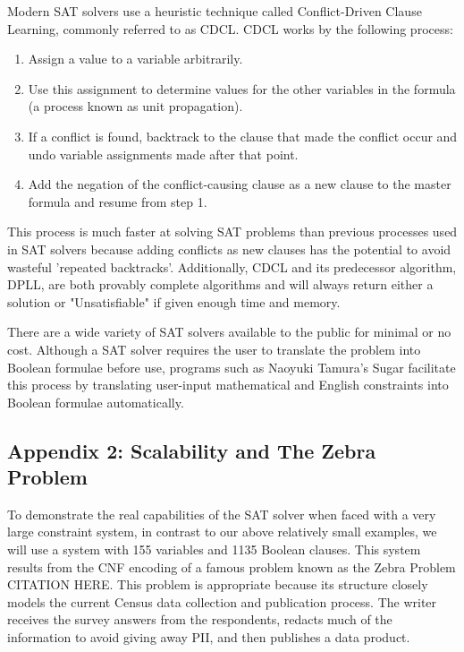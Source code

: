 \documentclass[jou,apacite]{apa6}
\begin{document}
Modern SAT solvers use a heuristic technique called Conflict-Driven Clause Learning, commonly referred to as CDCL. CDCL works by the following process:

\begin{enumerate}

\item Assign a value to a variable arbitrarily.
\item Use this assignment to determine values for the other variables in the formula (a process known as unit propagation).
\item If a conflict is found, backtrack to the clause that made the conflict occur and undo variable assignments made after that point.
\item Add the negation of the conflict-causing clause as a new clause to the master formula and resume from step 1.

\end{enumerate}

This process is much faster at solving SAT problems than previous processes used in SAT solvers because adding conflicts as new clauses has the potential to avoid wasteful 'repeated backtracks'. Additionally, CDCL and its predecessor algorithm, DPLL, are both provably complete algorithms and will always return either a solution or "Unsatisfiable" if given enough time and memory.

There are a wide variety of SAT solvers available to the public for minimal or no cost. Although a SAT solver requires the user to translate the problem into Boolean formulae before use,  programs such as Naoyuki Tamura's Sugar facilitate this process by translating user-input mathematical and English constraints into Boolean formulae automatically.

\subsection{Appendix 2: Scalability and The Zebra Problem}

To demonstrate the real capabilities of the SAT solver when faced with a very large constraint system, in contrast to our above relatively small examples, we will use a system with 155 variables and 1135 Boolean clauses. This system results from the CNF encoding of a famous problem known as the Zebra Problem CITATION HERE.
This problem is appropriate because its structure closely models the current Census data collection and publication process. The writer receives the survey answers from the respondents, redacts much of the information to avoid giving away PII, and then publishes a data product.
\end{document}
